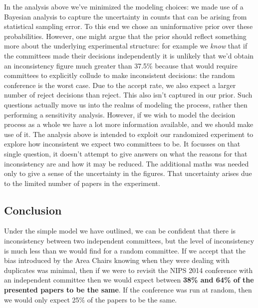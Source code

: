 \documentclass[a4paperpaper,]{article}
\begin{document}
In the analysis above we've minimized the modeling choices: we made use
of a Bayesian analysis to capture the uncertainty in counts that can be
arising from statistical sampling error. To this end we chose an
uninformative prior over these probabilities. However, one might argue
that the prior should reflect something more about the underlying
experimental structure: for example we \emph{know} that if the
committees made their decisions independently it is unlikely that we'd
obtain an inconsistency figure much greater than 37.5\% because that
would require committees to explicitly collude to make inconsistent
decisions: the random conference is the worst case. Due to the accept
rate, we also expect a larger number of reject decisions than reject.
This also isn't captured in our prior. Such questions actually move us
into the realms of modeling the process, rather then performing a
sensitivity analysis. However, if we wish to model the decision process
as a whole we have a lot more information available, and we should make
use of it. The analysis above is intended to exploit our randomized
experiment to explore how inconsistent we expect two committees to be.
It focusses on that single question, it doesn't attempt to give answers
on what the reasons for that inconsistency are and how it may be
reduced. The additional maths was needed only to give a sense of the
uncertainty in the figures. That uncertainty arises due to the limited
number of papers in the experiment.

\hypertarget{conclusion}{%
\subsection{Conclusion}\label{conclusion}}

\begin{flushright}
\end{flushright}

Under the simple model we have outlined, we can be confident that there
is inconsistency between two independent committees, but the level of
inconsistency is much less than we would find for a random committee. If
we accept that the bias introduced by the Area Chairs knowing when they
were dealing with duplicates was minimal, then if we were to revisit the
NIPS 2014 conference with an independent committee then we would expect
between \textbf{38\% and 64\% of the presented papers to be the same}.
If the conference was run at random, then we would only expect 25\% of
the papers to be the same.
\end{document}
